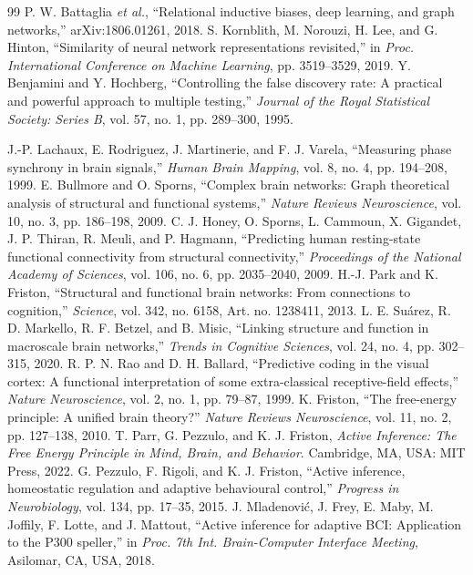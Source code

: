 \documentclass[journal]{IEEEtran}
\begin{document}
\begin{thebibliography}{99}
 P. W. Battaglia \emph{et al.}, ``Relational inductive biases, deep learning, and graph networks,'' arXiv:1806.01261, 2018.
 S. Kornblith, M. Norouzi, H. Lee, and G. Hinton, ``Similarity of neural network representations revisited,'' in \emph{Proc. International Conference on Machine Learning}, pp. 3519--3529, 2019.
 Y. Benjamini and Y. Hochberg, ``Controlling the false discovery rate: A practical and powerful approach to multiple testing,'' \emph{Journal of the Royal Statistical Society: Series B}, vol. 57, no. 1, pp. 289--300, 1995.




 J.-P. Lachaux, E. Rodriguez, J. Martinerie, and F. J. Varela, ``Measuring phase synchrony in brain signals,'' \emph{Human Brain Mapping}, vol. 8, no. 4, pp. 194--208, 1999.
 E. Bullmore and O. Sporns, ``Complex brain networks: Graph theoretical analysis of structural and functional systems,'' \emph{Nature Reviews Neuroscience}, vol. 10, no. 3, pp. 186--198, 2009.
 C. J. Honey, O. Sporns, L. Cammoun, X. Gigandet, J. P. Thiran, R. Meuli, and P. Hagmann, ``Predicting human resting-state functional connectivity from structural connectivity,'' \emph{Proceedings of the National Academy of Sciences}, vol. 106, no. 6, pp. 2035--2040, 2009.
 H.-J. Park and K. Friston, ``Structural and functional brain networks: From connections to cognition,'' \emph{Science}, vol. 342, no. 6158, Art. no. 1238411, 2013.
 L. E. Su\'arez, R. D. Markello, R. F. Betzel, and B. Misic, ``Linking structure and function in macroscale brain networks,'' \emph{Trends in Cognitive Sciences}, vol. 24, no. 4, pp. 302--315, 2020.
 R. P. N. Rao and D. H. Ballard, ``Predictive coding in the visual cortex: A functional interpretation of some extra-classical receptive-field effects,'' \emph{Nature Neuroscience}, vol. 2, no. 1, pp. 79--87, 1999.
 K. Friston, ``The free-energy principle: A unified brain theory?'' \emph{Nature Reviews Neuroscience}, vol. 11, no. 2, pp. 127--138, 2010.
 T. Parr, G. Pezzulo, and K. J. Friston, \emph{Active Inference: The Free Energy Principle in Mind, Brain, and Behavior}. Cambridge, MA, USA: MIT Press, 2022.
 G. Pezzulo, F. Rigoli, and K. J. Friston, ``Active inference, homeostatic regulation and adaptive behavioural control,'' \emph{Progress in Neurobiology}, vol. 134, pp. 17--35, 2015.
 J. Mladenovi\'{c}, J. Frey, E. Maby, M. Joffily, F. Lotte, and J. Mattout, ``Active inference for adaptive BCI: Application to the P300 speller,'' in \emph{Proc. 7th Int. Brain-Computer Interface Meeting}, Asilomar, CA, USA, 2018.


\end{thebibliography}
\end{document}
